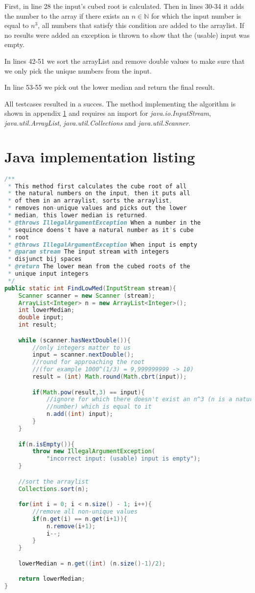 \documentclass[12pt]{article}
\begin{document}
First, in line 28 the input's cubed root is calculated. Then in lines 30-34 it adds the number to the array if there exists an $n \in \mathbb{N}$ for which the input number is equal to $n^3$, all numbers that satisfy this condition are added to the arraylist. If no results were added an exception is thrown to show that the (usable) input was empty.

In lines 42-51 we sort the arrayList and remove double values to make sure that we only pick the unique numbers from the input.

In line 53-55 we pick out the lower median and return the final result.

All testcases resulted in a succes. The method implementing the algorithm is shown in appendix \ref{codelisting} and requires an import for \textsl{java.io.InputStream}, \textsl{java.util.ArrayList}, \textsl{java.util.Collections} and \textsl{java.util.Scanner}.

\appendix

\section{Java implementation listing}
\label{codelisting}
\begin{lstlisting}[language=java]
/**
 * This method first calculates the cube root of all
 * the natural numbers on the input, then it puts all
 * of them in an arraylist, sorts the arraylist,
 * removes non-unique values and picks out the lower
 * median, this lower median is returned.
 * @throws IllegalArgumentException When a number in the
 * sequince doens't have a natural number as it's cube
 * root
 * @throws IllegalArgumentException When input is empty
 * @param stream The input stream with integers
 * disjunct bij spaces
 * @return The lower mean from the cubed roots of the
 * unique input integers
 */
public static int FindLowMed(InputStream stream){
    Scanner scanner = new Scanner (stream);
    ArrayList<Integer> n = new ArrayList<Integer>();
    int lowerMedian;
    double input;
    int result;

    while (scanner.hasNextDouble()){
        //only integers matter to us
        input = scanner.nextDouble();
        //round for approaching the root
        //(for example 1000^(1/3) = 9,999999999 -> 10)
        result = (int) Math.round(Math.cbrt(input));

        if(Math.pow(result,3) == input){
            //ignore for which there doesn't exist an n^3 (n is a natural
            //number) which is equal to it
            n.add((int) input);
        }
    }

    if(n.isEmpty()){
        throw new IllegalArgumentException(
            "incorrect input: (usable) input is empty");
    }

    //sort the arraylist
    Collections.sort(n);

    for(int i = 0; i < n.size() - 1; i++){
        //remove all non-unique values
        if(n.get(i) == n.get(i+1)){
            n.remove(i+1);
            i--;
        }
    }

    lowerMedian = n.get((int) (n.size()-1)/2);

    return lowerMedian;
}
\end{lstlisting}
\end{document}
